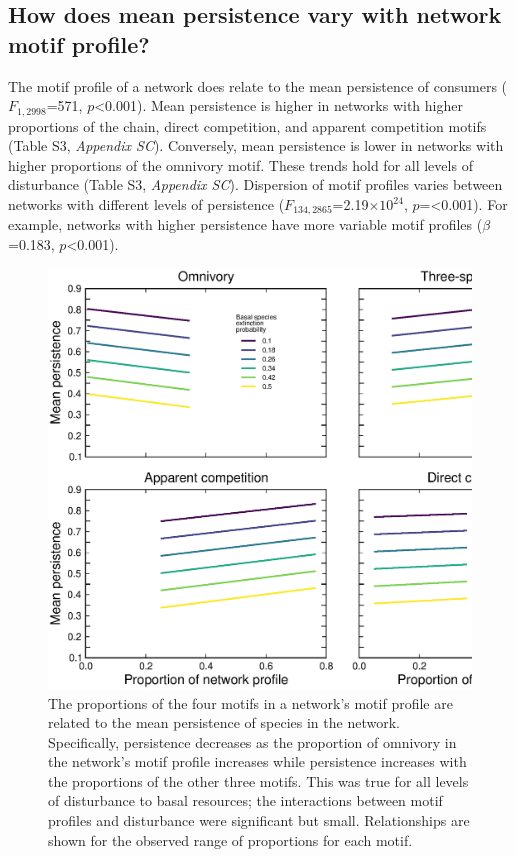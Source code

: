 \documentclass[12pt]{article}
\begin{document}
\begin{spacing}{2.0}
    \subsection*{How does mean persistence vary with network motif profile?}
    
        The motif profile of a network does relate to the mean persistence of consumers ($F_{1,2998}$=571, $p$\textless0.001). Mean persistence is higher in networks with higher proportions of the chain, direct competition, and apparent competition motifs (Table S3, \emph{Appendix SC}). Conversely, mean persistence is lower in networks with higher proportions of the omnivory motif. These trends hold for all levels of disturbance (Table S3, \emph{Appendix SC}). Dispersion of motif profiles varies between networks with different levels of persistence ($F_{134,2865}$=2.19$\times10^{24}$, $p$=\textless0.001). For example, networks with higher persistence have more variable motif profiles ($\beta$=0.183, $p$\textless0.001).


        \begin{figure}
            \centering
            \includegraphics[height=.5\textheight]{figures/persistence_motif_profiles.eps}
            \caption{The proportions of the four motifs in a network's motif profile are related to the mean persistence of species in the network. Specifically, persistence decreases as the proportion of omnivory in the network's motif profile increases while persistence increases with the proportions of the other three motifs. This was true for all levels of disturbance to basal resources; the interactions between motif profiles and disturbance were significant but small. Relationships are shown for the observed range of proportions for each motif.}      
            \label{fig:motif_profile_persistence}
        \end{figure}    


\end{spacing}
\end{document}
